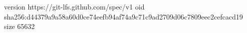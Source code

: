version https://git-lfs.github.com/spec/v1
oid sha256:d44379a9a58a60d0ce74eefb94af74a9c71c9ad2709d06c7809eec2cefcacd19
size 65632
